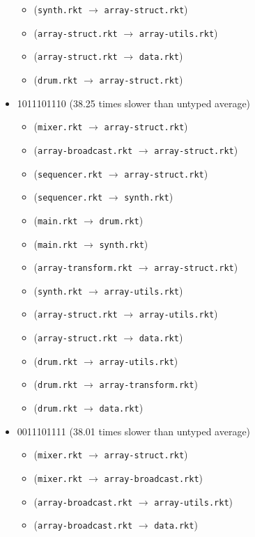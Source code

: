 \documentclass{article}
\newcommand{\mono}[1]{\texttt{#1}}
\begin{document}
\begin{itemize}
\begin{itemize}
  \item (\mono{synth.rkt} $\rightarrow$ \mono{array-struct.rkt})
  \item (\mono{array-struct.rkt} $\rightarrow$ \mono{array-utils.rkt})
  \item (\mono{array-struct.rkt} $\rightarrow$ \mono{data.rkt})
  \item (\mono{drum.rkt} $\rightarrow$ \mono{array-struct.rkt})
  \end{itemize}
\item 1011101110 (38.25 times slower than untyped average)
  \begin{itemize}
  \item (\mono{mixer.rkt} $\rightarrow$ \mono{array-struct.rkt})
  \item (\mono{array-broadcast.rkt} $\rightarrow$ \mono{array-struct.rkt})
  \item (\mono{sequencer.rkt} $\rightarrow$ \mono{array-struct.rkt})
  \item (\mono{sequencer.rkt} $\rightarrow$ \mono{synth.rkt})
  \item (\mono{main.rkt} $\rightarrow$ \mono{drum.rkt})
  \item (\mono{main.rkt} $\rightarrow$ \mono{synth.rkt})
  \item (\mono{array-transform.rkt} $\rightarrow$ \mono{array-struct.rkt})
  \item (\mono{synth.rkt} $\rightarrow$ \mono{array-utils.rkt})
  \item (\mono{array-struct.rkt} $\rightarrow$ \mono{array-utils.rkt})
  \item (\mono{array-struct.rkt} $\rightarrow$ \mono{data.rkt})
  \item (\mono{drum.rkt} $\rightarrow$ \mono{array-utils.rkt})
  \item (\mono{drum.rkt} $\rightarrow$ \mono{array-transform.rkt})
  \item (\mono{drum.rkt} $\rightarrow$ \mono{data.rkt})
  \end{itemize}
\item 0011101111 (38.01 times slower than untyped average)
  \begin{itemize}
  \item (\mono{mixer.rkt} $\rightarrow$ \mono{array-struct.rkt})
  \item (\mono{mixer.rkt} $\rightarrow$ \mono{array-broadcast.rkt})
  \item (\mono{array-broadcast.rkt} $\rightarrow$ \mono{array-utils.rkt})
  \item (\mono{array-broadcast.rkt} $\rightarrow$ \mono{data.rkt})

\end{itemize}
\end{itemize}
\end{document}
